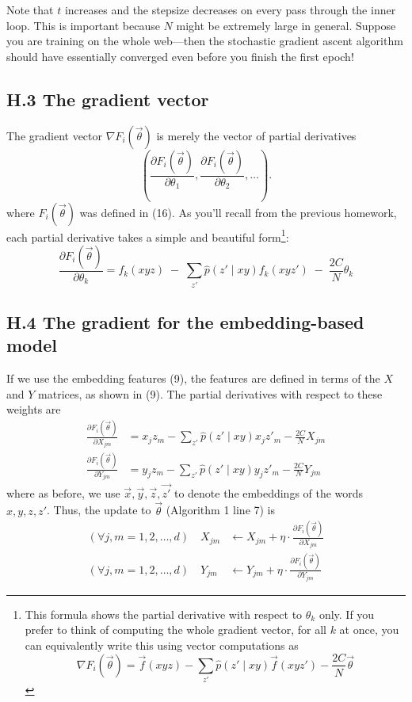 Note that $t$ increases and the stepsize decreases on every pass through the inner loop. This is important because $N$ might be extremely large in general. Suppose you are training on the whole web—then the stochastic gradient ascent algorithm should have essentially converged even before you finish the first epoch!  

\subsection*{H.3 The gradient vector}

The gradient vector $\nabla F_i(\vec{\theta})$ is merely the vector of partial derivatives 
\[
\left( \frac{\partial F_i(\vec{\theta})}{\partial \theta_1}, \frac{\partial F_i(\vec{\theta})}{\partial \theta_2}, \ldots \right).
\]
where $F_i(\vec{\theta})$ was defined in (16). As you’ll recall from the previous homework, each partial derivative takes a simple and beautiful form\footnote{This formula shows the partial derivative with respect to $\theta_k$ only. If you prefer to think of computing the whole gradient vector, for all $k$ at once, you can equivalently write this using vector computations as 
\[
\nabla F_i(\vec{\theta}) = \vec{f}(xyz) - \sum_{z'} \hat{p}(z' \mid xy)\vec{f}(xyz') - \frac{2C}{N}\vec{\theta}
\]}:
\begin{equation}
\frac{\partial F_i(\vec{\theta})}{\partial \theta_k} = f_k(xyz) \;-\; \sum_{z'} \hat{p}(z' \mid xy) f_k(xyz') \;-\; \frac{2C}{N}\theta_k
\end{equation}

\subsection*{H.4 The gradient for the embedding-based model}

If we use the embedding features (9), the features are defined in terms of the $X$ and $Y$ matrices, as shown in (9). The partial derivatives with respect to these weights are
\begin{align}
\frac{\partial F_i(\vec{\theta})}{\partial X_{jm}} &= x_j z_m - \sum_{z'} \hat{p}(z' \mid xy)x_j z'_m - \frac{2C}{N}X_{jm} \\
\frac{\partial F_i(\vec{\theta})}{\partial Y_{jm}} &= y_j z_m - \sum_{z'} \hat{p}(z' \mid xy)y_j z'_m - \frac{2C}{N}Y_{jm}
\end{align}
where as before, we use $\vec{x}, \vec{y}, \vec{z}, \vec{z'}$ to denote the embeddings of the words $x, y, z, z'$. Thus, the update to $\vec{\theta}$ (Algorithm 1 line 7) is
\begin{align}
(\forall j,m = 1,2,\ldots,d) \quad X_{jm} &\gets X_{jm} + \eta \cdot \frac{\partial F_i(\vec{\theta})}{\partial X_{jm}} \\
(\forall j,m = 1,2,\ldots,d) \quad Y_{jm} &\gets Y_{jm} + \eta \cdot \frac{\partial F_i(\vec{\theta})}{\partial Y_{jm}}
\end{align}

